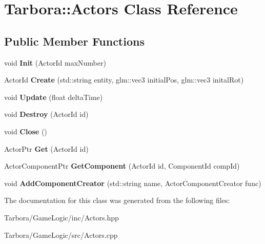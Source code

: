 \hypertarget{classTarbora_1_1Actors}{}\section{Tarbora\+:\+:Actors Class Reference}
\label{classTarbora_1_1Actors}
\subsection*{Public Member Functions}
\begin{DoxyCompactItemize}
\item 
\mbox{\label{classTarbora_1_1Actors_a9e09b6da09c97b4acb69b27ae9d108bf}} 
void {\bfseries Init} (Actor\+Id max\+Number)
\item 
\mbox{\label{classTarbora_1_1Actors_afae16607fc34e3fbb758dd009202e68a}} 
Actor\+Id {\bfseries Create} (std\+::string entity, glm\+::vec3 initial\+Pos, glm\+::vec3 inital\+Rot)
\item 
\mbox{\label{classTarbora_1_1Actors_a38efa123a6f153efa2777826cab3583e}} 
void {\bfseries Update} (float delta\+Time)
\item 
\mbox{\label{classTarbora_1_1Actors_a9cf58e602f61558c3936adf7c2f4b6dc}} 
void {\bfseries Destroy} (Actor\+Id id)
\item 
\mbox{\label{classTarbora_1_1Actors_a268df652a243f370f6e706d14ef88557}} 
void {\bfseries Close} ()
\item 
\mbox{\label{classTarbora_1_1Actors_a266738549f212b6992b63a3e28e9e963}} 
Actor\+Ptr {\bfseries Get} (Actor\+Id id)
\item 
\mbox{\label{classTarbora_1_1Actors_af8d33b255eb208c93a2bf74700673713}} 
Actor\+Component\+Ptr {\bfseries Get\+Component} (Actor\+Id id, Component\+Id comp\+Id)
\item 
\mbox{\label{classTarbora_1_1Actors_a6a378c359e4dd85f8eaa4b33bc4889f9}} 
void {\bfseries Add\+Component\+Creator} (std\+::string name, Actor\+Component\+Creator func)
\end{DoxyCompactItemize}


The documentation for this class was generated from the following files\+:\begin{DoxyCompactItemize}
\item 
Tarbora/\+Game\+Logic/inc/Actors.\+hpp\item 
Tarbora/\+Game\+Logic/src/Actors.\+cpp\end{DoxyCompactItemize}
